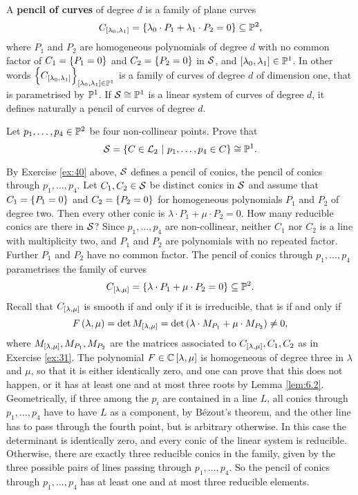 \begin{definition}
A \textbf{pencil of curves} of degree $ d $ is a family of plane curves
$$ C_{\sbr{\lambda_0, \lambda_1}} = \cbr{\lambda_0 \cdot P_1 + \lambda_1 \cdot P_2 = 0} \subseteq \PP^2, $$
where $ P_1 $ and $ P_2 $ are homogeneous polynomials of degree $ d $ with no common factor of $ C_1 = \cbr{P_1 = 0} $ and $ C_2 = \cbr{P_2 = 0} $ in $ \mathcal{S} $, and $ \sbr{\lambda_0, \lambda_1} \in \PP^1 $. In other words $ \cbr{C_{\sbr{\lambda_0, \lambda_1}}}_{\sbr{\lambda_0, \lambda_1} \in \PP^1} $ is a family of curves of degree $ d $ of dimension one, that is parametrised by $ \mathbb{P}^1 $. If $ \mathcal{S} \cong \mathbb{P}^1 $ is a linear system of curves of degree $ d $, it defines naturally a pencil of curves of degree $ d $.
\end{definition}

\begin{exercise**}
\label{ex:40}
Let $ p_1, \dots, p_4 \in \mathbb{P}^2 $ be four non-collinear points. Prove that
$$ \SSS = \cbr{C \in \LLL_2 \st p_1, \dots, p_4 \in C} \cong \PP^1. $$
\end{exercise**}

\begin{example}
By Exercise \ref{ex:40} above, $ \mathcal{S} $ defines a pencil of conics, the pencil of conics through $ p_1, \dots, p_4 $. Let $ C_1, C_2 \in \mathcal{S} $ be distinct conics in $ \mathcal{S} $ and assume that $ C_1 = \cbr{P_1 = 0} $ and $ C_2 = \cbr{P_2 = 0} $ for homogeneous polynomials $ P_1 $ and $ P_2 $ of degree two. Then every other conic is $ \lambda \cdot P_1 + \mu \cdot P_2 = 0 $. How many reducible conics are there in $ \mathcal{S} $? Since $ p_1, \dots, p_4 $ are non-collinear, neither $ C_1 $ nor $ C_2 $ is a line with multiplicity two, and $ P_1 $ and $ P_2 $ are polynomials with no repeated factor. Further $ P_1 $ and $ P_2 $ have no common factor. The pencil of conics through $ p_1, \dots, p_4 $ parametrises the family of curves
$$ C_{\sbr{\lambda, \mu}} = \cbr{\lambda \cdot P_1 + \mu \cdot P_2 = 0} \subseteq \PP^2. $$
Recall that $ C_{\sbr{\lambda, \mu}} $ is smooth if and only if it is irreducible, that is if and only if
$$ F\br{\lambda, \mu} = \det M_{\sbr{\lambda, \mu}} = \det \br{\lambda \cdot M_{P_1} + \mu \cdot M_{P_2}} \ne 0, $$
where $ M_{\sbr{\lambda, \mu}}, M_{P_1}, M_{P_2} $ are the matrices associated to $ C_{\sbr{\lambda, \mu}}, C_1, C_2 $ as in Exercise \ref{ex:31}. The polynomial $ F \in \CC\sbr{\lambda, \mu} $ is homogeneous of degree three in $ \lambda $ and $ \mu $, so that it is either identically zero, and one can prove that this does not happen, or it has at least one and at most three roots by Lemma \ref{lem:6.2}. Geometrically, if three among the $ p_i $ are contained in a line $ L $, all conics through $ p_1, \dots, p_4 $ have to have $ L $ as a component, by B\'ezout's theorem, and the other line has to pass through the fourth point, but is arbitrary otherwise. In this case the determinant is identically zero, and every conic of the linear system is reducible. Otherwise, there are exactly three reducible conics in the family, given by the three possible pairs of lines passing through $ p_1, \dots, p_4 $. So the pencil of conics through $ p_1, \dots, p_4 $ has at least one and at most three reducible elements.
\end{example}

